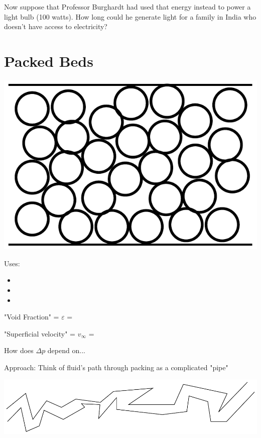 \documentclass[paper=a4, fontsize=12pt]{scrartcl} %
\numberwithin{equation}{section} %
\numberwithin{figure}{section} %
\numberwithin{table}{section} %
\begin{document}
\vspace{11cm}  Now suppose that Professor Burghardt had used that energy instead to power a light bulb (100 watts). How long could he generate light for a family in India who doesn't have access to electricity?

\newpage

\section*{Packed Beds}
\vspace{0.5cm}  \hspace*{0.5cm}  \includegraphics[scale=0.6]{packedbed.pdf}




\vspace{0.5cm}   Uses:
\begin{itemize}
  \item 
  \item 
  \item  
\end{itemize}

"Void Fraction" = $\varepsilon$ =

\vspace{0.8cm}   "Superficial velocity" = $v_{\infty}$ =

\vspace{0.5cm}   How does $\Delta p$ depend on...


\vspace{1cm}   Approach: Think of fluid's path through  packing as a complicated "pipe"

\vspace{0.5cm}   \includegraphics[scale=0.8]{crazypipe.pdf}
\end{document}
